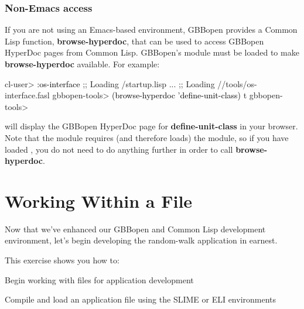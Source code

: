 \documentclass[10pt,twoside,english,pdftex]{article}
\begin{document}
\subsubsection*{Non-Emacs access}

%
If you are not using an Emacs-based environment, GBBopen provides a Common
Lisp function, \textbf{browse-hyperdoc}, that can be used to access GBBopen
HyperDoc pages from Common Lisp.  GBBopen's  module must
be loaded to make \textbf{browse-hyperdoc} available.  For example:
%
\W\supp
\begin{example}
\textcolor{darkergray}{%
  cl-user> \textcolor{black}{:os-interface}
  ;; Loading /startup.lisp
     ...
  ;; Loading //tools/os-interface.fasl
  gbbopen-tools> \textcolor{black}{(browse-hyperdoc 'define-unit-class)}
  t
  gbbopen-tools>}
\end{example}
%
will display the GBBopen HyperDoc page for \textbf{define-unit-class} in your
browser.  Note that the  module requires (and therefore
loads) the  module, so if you have loaded
, you do not need to do anything further in order to call
\textbf{browse-hyperdoc}.


\T\markright{}%
\T\pagestyle{plain}
\T\cleardoublepage
\W{}
\T\pagestyle{fancy}
\T\thispagestyle{fancybottom}
\T\renewcommand{\headrulewidth}{0pt}
\section{Working Within a File}
\label{sec:file}%

Now that we've enhanced our GBBopen and Common Lisp development environment,
let's begin developing the random-walk application in earnest.

\fndocrule

This exercise shows you how to:
\begin{tightitemize}
\item Begin working with files for application development
\item Compile and load an application file using the SLIME or ELI
  environments
\end{tightitemize}

\fndocrule
\end{document}
